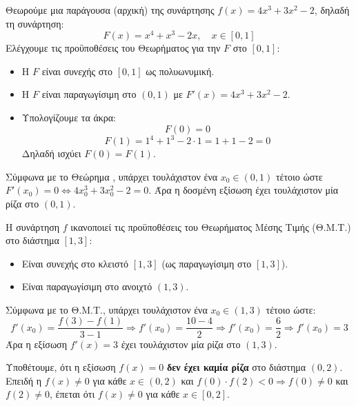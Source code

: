 
\lysh
Θεωρούμε μια παράγουσα (αρχική) της συνάρτησης $f(x) = 4x^3 + 3x^2 - 2$, δηλαδή τη συνάρτηση:
\[ F(x) = x^4 + x^3 - 2x, \quad x \in [0, 1] \]
Ελέγχουμε τις προϋποθέσεις του Θεωρήματος  για την $F$ στο $[0, 1]$:
\begin{itemize}
    \item Η $F$ είναι συνεχής στο $[0, 1]$ ως πολυωνυμική.
    \item Η $F$ είναι παραγωγίσιμη στο $(0, 1)$ με $F'(x) = 4x^3 + 3x^2 - 2$.
    \item Υπολογίζουμε τα άκρα:
    \[ F(0) = 0 \]
    \[ F(1) = 1^4 + 1^3 - 2\cdot 1 = 1 + 1 - 2 = 0 \]
    Δηλαδή ισχύει $F(0) = F(1)$.
\end{itemize}
Σύμφωνα με το Θεώρημα , υπάρχει τουλάχιστον ένα $x_0 \in (0, 1)$ τέτοιο ώστε $F'(x_0) = 0 \Leftrightarrow 4x_0^3 + 3x_0^2 - 2 = 0$.
Άρα η δοσμένη εξίσωση έχει τουλάχιστον μία ρίζα στο $(0, 1)$.\\


\lysh
Η συνάρτηση $f$ ικανοποιεί τις προϋποθέσεις του Θεωρήματος Μέσης Τιμής (Θ.Μ.Τ.) στο διάστημα $[1, 3]$:
\begin{itemize}
    \item Είναι συνεχής στο κλειστό $[1, 3]$ (ως παραγωγίσιμη στο $[1, 3]$).
    \item Είναι παραγωγίσιμη στο ανοιχτό $(1, 3)$.
\end{itemize}
Σύμφωνα με το Θ.Μ.Τ., υπάρχει τουλάχιστον ένα $x_0 \in (1, 3)$ τέτοιο ώστε:
\[ f'(x_0) = \frac{f(3) - f(1)}{3 - 1} \Rightarrow f'(x_0) = \frac{10 - 4}{2} \Rightarrow f'(x_0) = \frac{6}{2} \Rightarrow f'(x_0) = 3 \]
Άρα η εξίσωση $f'(x) = 3$ έχει τουλάχιστον μία ρίζα στο $(1, 3)$.\\


\lysh
Υποθέτουμε, ότι η εξίσωση $f(x) = 0$ \textbf{δεν έχει καμία ρίζα} στο διάστημα $(0, 2)$. 
Επειδή η $f(x) \neq 0$ για κάθε $x \in (0, 2)$ και $f(0) \cdot f(2) < 0 \Rightarrow f(0) \neq 0$ και $f(2) \neq 0$, έπεται ότι $f(x) \neq 0$ για κάθε $x \in [0, 2]$.

